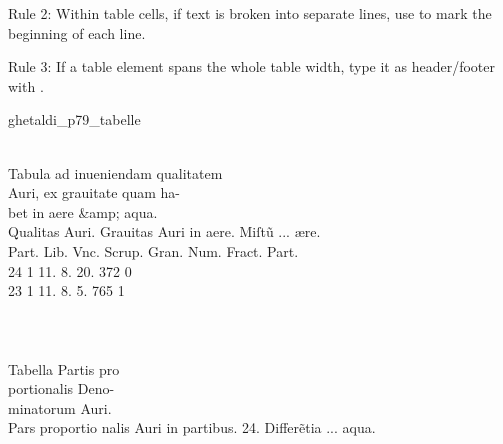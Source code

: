\vspace{3mm}
\begin{mainrule}
Rule 2: Within table cells, if text is broken into separate lines, use  to mark the beginning of each line.
\end{mainrule}

\vspace{3mm}
\begin{mainruleLessImportant}
Rule 3: If a table element spans the whole table width, type it as header/footer with .
\end{mainruleLessImportant}

\begin{sampleImage}{ghetaldi_p79_tabelle}

\begin{typeLatin}
 \\
Tabula ad inueniendam qualitatem  \\
Auri, ex grauitate quam ha-  \\
bet in aere &amp; aqua.  \\
Qualitas  Auri.  Grauitas Auri \lwr in aere.  Miſt\~u ... ære. \\
Part.  Lib.  Vnc.  Scrup. \lwr{} Gran.  Num. Fract.  Part. \\
24  1  11.  8. \lwr{} 20.  372  0 \\
23  1  11.  8. \lwr{} 5.  765  1 \\
\someText \\
 \\
 \\
Tabella Partis pro  \\
portionalis Deno-  \\
minatorum Auri. \\
Pars proportio  nalis Auri in  partibus. 24. \lwr{} Differ\~etia ... aqua. \\

\end{typeLatin}
\end{sampleImage}
